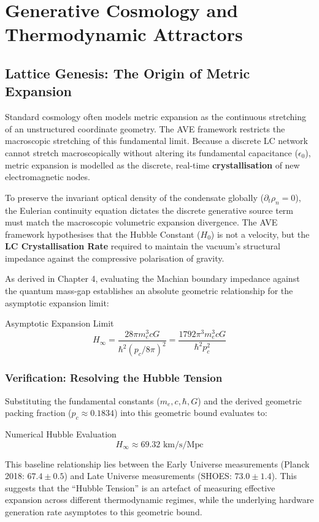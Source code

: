\chapter{Generative Cosmology and Thermodynamic Attractors}
\label{ch:cosmology}

\section{Lattice Genesis: The Origin of Metric Expansion}
Standard cosmology often models metric expansion as the continuous stretching of an unstructured coordinate geometry. The AVE framework restricts the macroscopic stretching of this fundamental limit. Because a discrete LC network cannot stretch macroscopically without altering its fundamental capacitance ($\epsilon_0$), metric expansion is modelled as the discrete, real-time \textbf{crystallisation} of new electromagnetic nodes.

To preserve the invariant optical density of the condensate globally ($\partial_t \rho_n = 0$), the Eulerian continuity equation dictates the discrete generative source term must match the macroscopic volumetric expansion divergence. The AVE framework hypothesises that the Hubble Constant ($H_0$) is not a velocity, but the \textbf{LC Crystallisation Rate} required to maintain the vacuum's structural impedance against the compressive polarisation of gravity.

As derived in Chapter 4, evaluating the Machian boundary impedance against the quantum mass-gap establishes an absolute geometric relationship for the asymptotic expansion limit:
\begin{resultbox}{Asymptotic Expansion Limit}
\begin{equation}
    H_{\infty} = \frac{28\pi m_e^3 c G}{\hbar^2 (p_c/8\pi)^2} = \frac{1792\pi^3 m_e^3 c G}{\hbar^2 p_c^2}
\end{equation}
\end{resultbox}

\subsection{Verification: Resolving the Hubble Tension}
Substituting the fundamental constants ($m_e, c, \hbar, G$) and the derived geometric packing fraction ($p_c \approx 0.1834$) into this geometric bound evaluates to:
\begin{resultbox}{Numerical Hubble Evaluation}
\begin{equation}
    H_{\infty} \approx 69.32 \text{ km/s/Mpc}
\end{equation}
\end{resultbox}
This baseline relationship lies between the Early Universe measurements (Planck 2018: $67.4 \pm 0.5$) and Late Universe measurements (SHOES: $73.0 \pm 1.4$). This suggests that the ``Hubble Tension'' is an artefact of measuring effective expansion across different thermodynamic regimes, while the underlying hardware generation rate asymptotes to this geometric bound.

